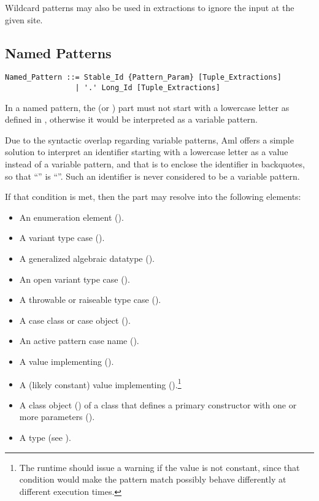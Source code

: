 Wildcard patterns may also be used in extractions to ignore the input at the given site. 





\subsection{Named Patterns}
\label{sec:named-patterns}

\grammar\begin{lstlisting}
Named_Pattern ::= Stable_Id {Pattern_Param} [Tuple_Extractions]
                | '.' Long_Id [Tuple_Extractions]
\end{lstlisting}

In a named pattern, the  (or ) part must not start with a lowercase letter as defined in , otherwise it would be interpreted as a variable pattern. 

Due to the syntactic overlap regarding variable patterns, Aml offers a simple solution to interpret an identifier starting with a lowercase letter as a value instead of a variable pattern, and that is to enclose the identifier in backquotes, so that ``'' is ``''. Such an identifier is never considered to be a variable pattern. 

If that condition is met, then the  part may resolve into the following elements:
\begin{itemize}
  \item An enumeration element (). 
  \item A variant type case (). 
  \item A generalized algebraic datatype (). 
  \item An open variant type case (). 
  \item A throwable or raiseable type case (). 
  \item A case class or case object (). 
  \item An active pattern case name (). 
  \item A value implementing  ().
  \item A (likely constant) value implementing  ().\footnote{The runtime should issue a warning if the value is not constant, since that condition would make the pattern match possibly behave differently at different execution times.}
  \item A class object () of a class that defines a primary constructor with one or more parameters ().
  \item A type (see ).
\end{itemize}

